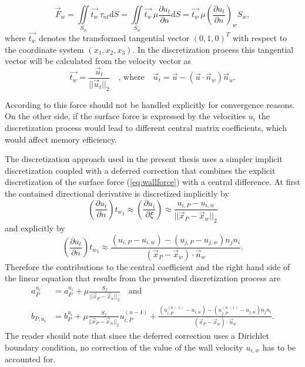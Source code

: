 \begin{equation}
  \label{eq:wallforce}
  \vec{F}_w 
  =  
  \iint\limits_{S_w} \vec{t_w} \, \tau_{nt} \mathrm{d}S
  =
  \iint\limits_{S_w} \vec{t_w} \, \mu \frac{\partial u_t}{\partial n} \mathrm{d}S
  =
  \vec{t_w} \, \mu \left(\frac{\partial u_t}{\partial n}\right)_w S_w,
\end{equation}
where \( \vec{t_w} \) denotes the transformed tangential vector \((0,1,0)^T\) with respect to the coordinate system \((x_1,x_2,x_3)\). In the discretization process this tangential vector will be calculated from the velocity vector as
\begin{displaymath}
  \vec{t_w} = \frac{\vec{u}_t}{|| \vec{u}_t ||_2} \quad \text{, where} \quad \vec{u}_t = \vec{u} - \left( \vec{u} \cdot \vec{n}_w \right) \vec{n}_w.
\end{displaymath}

According to \cite{ferziger02} this force should not be handled explicitly for convergence reasons. On the other side, if the surface force is expressed by the velocities \(u_i\) the discretization process would lead to different central matrix coefficients, which would affect memory efficiency.

The discretization approach used in the present thesis uses a simpler implicit discretization coupled with a deferred correction that combines the explicit discretization of the surface force (\ref{eq:wallforce}) with a central difference. At first the contained directional derivative is discretized implicitly by
\begin{displaymath}
  \left(\frac{\partial u_t}{\partial n}\right) {t_w}_i
  \approx
  \left(\frac{\partial u_i}{\partial \xi}\right)
  \approx
  \frac{u_{i,P} - u_{i,w}}{|| \vec{x}_P - \vec{x}_w ||_2}
\end{displaymath}
and explicitly by
\begin{displaymath}
  \left(\frac{\partial u_t}{\partial n}\right) {t_w}_i
  \approx
  \frac{\left(u_{i,P}- u_{i,w} \right) - \left(u_{j,P} - u_{j,w}\right) n_j n_i  }{\left( \vec{x}_P - \vec{x}_w \right) \cdot \vec{n}_w}.
\end{displaymath}
Therefore the contributions to the central coefficient and the right hand side of the linear equation that results from the presented discretization process are
\begin{align*}
  a_P^{u_i} &= a_P^{u_i} + \mu \frac{S_f}{|| \vec{x}_P - \vec{x}_w ||_2} \quad \text{and} \\
  b_{P,u_i} &= b_P^{u_i} + \mu \frac{S_f}{|| \vec{x}_P - \vec{x}_w ||_2} u_{i,P}^{(n-1)} + 
  \frac{\left(u_{i,P}^{(n-1)}- u_{i,w} \right) - \left(u_{j,P}^{(n-1)} - u_{j,w}\right) n_j n_i  }{\left( \vec{x}_P - \vec{x}_w \right) \cdot \vec{n}_w}.
\end{align*}
The reader should note that since the deferred correction uses a Dirichlet boundary condition, no correction of the value of the wall velocity \(u_{i,w}\) has to be accounted for.

